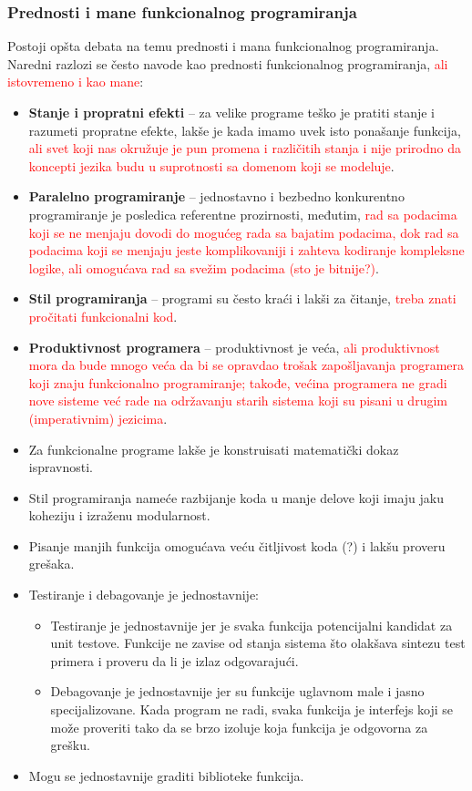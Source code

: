 \documentclass[../main.tex]{subfiles}
\begin{document}
	   \subsubsection{Prednosti i mane funkcionalnog programiranja}
	   
	   Postoji opšta debata na temu prednosti i mana funkcionalnog programiranja. Naredni razlozi se često navode kao prednosti funkcionalnog programiranja, \textcolor{red}{ali istovremeno i kao mane}:
	   \begin{itemize}
	   
	   \item {\bf Stanje i propratni efekti} -- za velike programe teško je pratiti stanje i razumeti propratne efekte, lakše je kada imamo uvek isto ponašanje funkcija, \textcolor{red}{ali svet koji nas okružuje je pun promena i različitih stanja i nije prirodno da koncepti jezika budu u suprotnosti sa domenom koji se modeluje}.
	   \item {\bf Paralelno programiranje} -- jednostavno i bezbedno konkurentno programiranje je posledica referentne prozirnosti, međutim, \textcolor{red}{rad sa podacima koji se ne menjaju dovodi do mogućeg rada sa bajatim podacima, dok rad sa podacima koji se menjaju jeste komplikovaniji i zahteva kodiranje kompleksne logike, ali omogućava rad sa svežim podacima (sto je bitnije?)}.
	   \item {\bf Stil programiranja} -- programi su često kraći i lakši za čitanje, \textcolor{red}{treba znati pročitati funkcionalni kod}.
	   \item {\bf Produktivnost programera} -- produktivnost je veća, \textcolor{red}{ali produktivnost mora da bude mnogo veća da bi se opravdao trošak zapošljavanja programera koji znaju funkcionalno programiranje; takođe, većina programera ne gradi nove sisteme već rade na održavanju starih sistema koji su pisani u drugim (imperativnim) jezicima}.
	   \item Za funkcionalne programe lakše je konstruisati matematički dokaz ispravnosti.
	   \item Stil programiranja nameće razbijanje koda u manje delove koji imaju jaku koheziju i izraženu modularnost.
	   \item Pisanje manjih funkcija omogućava veću čitljivost koda (?) i lakšu proveru grešaka.
	   \item Testiranje i debagovanje je jednostavnije:
	   \begin{itemize}
	   \item Testiranje je jednostavnije jer je svaka funkcija potencijalni kandidat za unit testove. Funkcije ne zavise od stanja sistema što olakšava sintezu test primera i proveru da li je izlaz odgovarajući.
	   \item Debagovanje je jednostavnije jer su funkcije uglavnom male i jasno specijalizovane. Kada program ne radi, svaka funkcija je interfejs koji se može proveriti tako da se brzo izoluje koja funkcija je odgovorna za grešku.
	   \end{itemize}
	   \item Mogu se jednostavnije graditi biblioteke funkcija.
	   

\end{itemize}
\end{document}
